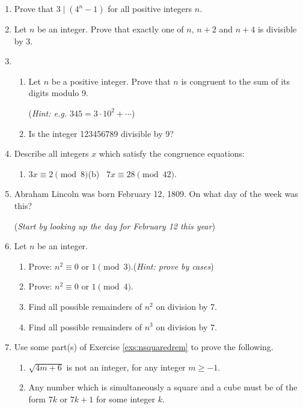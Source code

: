 \begin{exercises}{}{}
\begin{enumerate}
	  
	  \item Prove that $3\mid(4^n-1)$ for all positive integers $n$.
	  
		
		\item Let $n$ be an integer. Prove that exactly one of $n$, $n+2$ and $n+4$ is divisible by 3.
	  
	  
	  \item\begin{enumerate}
	    \item Let $n$ be a positive integer. Prove that $n$ is congruent to the sum of its digits modulo 9.\par
	    (\emph{Hint: e.g.{} $345=3\cdot 10^2+\cdots$})
	    \item Is the integer 123456789 divisible by 9?
	  \end{enumerate}
	  
	    
	  \item Describe all integers $x$ which satisfy the congruence equations:
	  \begin{enumerate}
	    \item $3x\equiv 2\pmod 8$\qquad\qquad (b) \ $7x\equiv 28\pmod{42}$.
	  \end{enumerate}
		
		
		\item Abraham Lincoln was born February 12\th, 1809. On what day of the week was this?\par
		(\emph{Start by looking up the day for February 12\th{} \emph{this year}})
		
		
		\item\label{exs:nsquaredrem} Let $n$ be an integer.
		\begin{enumerate}
	    \item Prove: $n^2\equiv 0$ or $1\pmod 3$.\quad (\emph{Hint: prove by cases})
	    \item Prove: $n^2\equiv 0$ or $1\pmod 4$.
	    \item Find all possible remainders of $n^2$ on division by $7$.
	    \item Find all possible remainders of $n^3$ on division by $7$.
	  \end{enumerate}
	    
	    
		\item Use some part(s) of Exercise \ref{exs:nsquaredrem} to prove the following.
		\begin{enumerate}
			\item $\sqrt{4m+6}$ is not an integer, for any integer $m\ge -1$.
	    \item Any number which is simultaneously a square and a cube must be of the form $7k$ or $7k+1$ for some integer $k$.
	  \end{enumerate}
	    

\end{enumerate}
\end{exercises}
